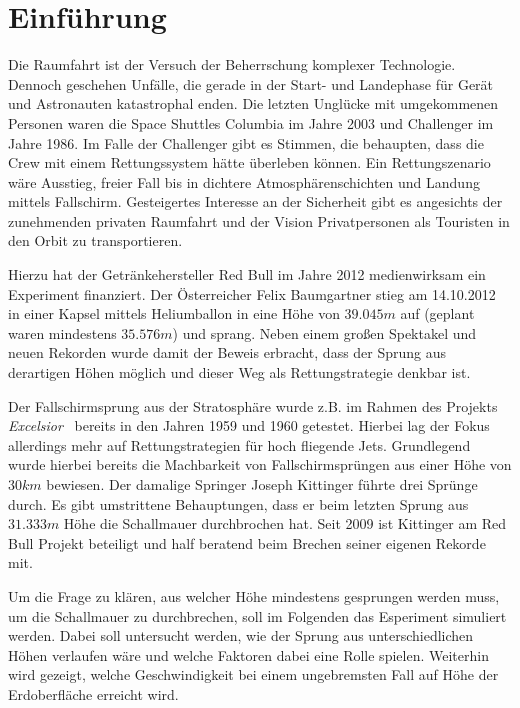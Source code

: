 \newpage

\section{Einführung}

Die Raumfahrt ist der Versuch der Beherrschung komplexer Technologie.
Dennoch geschehen Unfälle, die gerade in der Start- und Landephase für Gerät und Astronauten katastrophal enden.
Die letzten Unglücke mit umgekommenen Personen waren die Space Shuttles Columbia im Jahre 2003 und Challenger im Jahre 1986.
Im Falle der Challenger gibt es Stimmen, die behaupten, dass die Crew mit einem Rettungssystem hätte überleben können.
Ein Rettungszenario wäre Ausstieg, freier Fall bis in dichtere Atmosphärenschichten und Landung mittels Fallschirm.
Gesteigertes Interesse an der Sicherheit gibt es angesichts der zunehmenden privaten Raumfahrt und der Vision Privatpersonen als Touristen in den Orbit zu transportieren.

Hierzu hat der Getränkehersteller Red Bull im Jahre 2012 medienwirksam ein Experiment finanziert.
Der Österreicher Felix Baumgartner stieg am 14.10.2012 in einer Kapsel mittels Heliumballon in eine Höhe von $39.045m$ auf (geplant waren mindestens $35.576m$) und sprang.
Neben einem großen Spektakel und neuen Rekorden wurde damit der Beweis erbracht, dass der Sprung aus derartigen Höhen möglich und dieser Weg als Rettungstrategie denkbar ist.

Der Fallschirmsprung aus der Stratosphäre wurde z.B. im Rahmen des Projekts \emph{Excelsior}~\cite{af.mil:excelsior} bereits in den Jahren 1959 und 1960 getestet.
Hierbei lag der Fokus allerdings mehr auf Rettungstrategien für hoch fliegende Jets.
Grundlegend wurde hierbei bereits die Machbarkeit von Fallschirmsprüngen aus einer Höhe von $30km$ bewiesen.
Der damalige Springer Joseph Kittinger führte drei Sprünge durch.
Es gibt umstrittene Behauptungen, dass er beim letzten Sprung aus $31.333m$ Höhe die Schallmauer durchbrochen hat.
Seit 2009 ist Kittinger am Red Bull Projekt beteiligt und half beratend beim Brechen seiner eigenen Rekorde mit.

Um die Frage zu klären, aus welcher Höhe mindestens gesprungen werden muss, um die Schallmauer zu durchbrechen, soll im Folgenden das Esperiment simuliert werden.
Dabei soll untersucht werden, wie der Sprung aus unterschiedlichen Höhen verlaufen wäre und welche Faktoren dabei eine Rolle spielen.
Weiterhin wird gezeigt, welche Geschwindigkeit bei einem ungebremsten Fall auf Höhe der Erdoberfläche erreicht wird.

